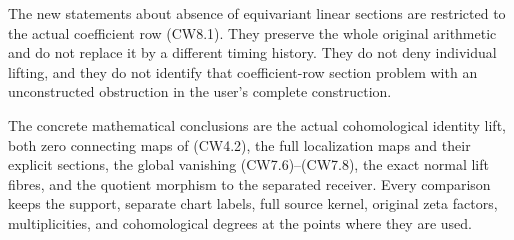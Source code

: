 The new statements about absence of equivariant linear sections are
restricted to the actual coefficient row (CW8.1). They preserve the
whole original arithmetic and do not replace it by a different timing
history. They do not deny individual lifting, and they do not identify
that coefficient-row section problem with an unconstructed obstruction
in the user's complete construction.

The concrete mathematical conclusions are the actual cohomological
identity lift, both zero connecting maps of (CW4.2), the full
localization maps and their explicit sections, the global vanishing
(CW7.6)--(CW7.8), the exact normal lift fibres, and the quotient
morphism to the separated receiver. Every comparison keeps the support,
separate chart labels, full source kernel, original zeta factors,
multiplicities, and cohomological degrees at the points where they are
used.
